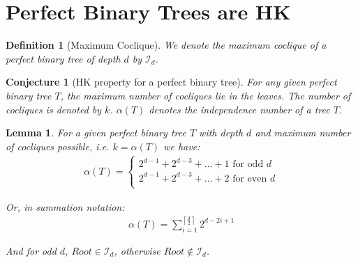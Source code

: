 \documentclass{amsart}
\newtheorem{lemma}[theorem]{Lemma}
\newtheorem{conjecture}[theorem]{Conjecture}
\newtheorem{definition}[theorem]{Definition}
\theoremstyle{definition}
\begin{document}
\section{Perfect Binary Trees are HK}

\begin{definition}[Maximum Coclique]
	We denote the maximum coclique of a perfect binary tree of depth $d$ by $\mathcal{I}_d$.
\end{definition}

\begin{conjecture}[HK property for a perfect binary tree]
	For any given perfect binary tree $T$, the maximum number of cocliques lie in the leaves. The number of cocliques is denoted by $k$. $\alpha(T)$ denotes the independence number of a tree $T$.
\end{conjecture}

\begin{lemma}\label{independence_num}
	For a given perfect binary tree $T$ with depth $d$ and maximum number of cocliques possible, i.e. $k = \alpha(T)$ we have:
	\begin{align*}
		\alpha(T) = \begin{cases}
			            2^{d - 1} + 2^{d-3} + \ldots + 1 \text{ for odd $d$}  \\
			            2^{d - 1} + 2^{d-3} + \ldots + 2 \text{ for even $d$} \\
		            \end{cases}
	\end{align*}

	Or, in summation notation:
	\begin{align*}
		\alpha(T) = \displaystyle\sum_{i = 1}^{\left\lceil \frac{d}{2} \right\rceil} 2^{d - 2i + 1}
	\end{align*}

	And for odd $d$, $Root \in \mathcal{I}_d$, otherwise $Root \not\in \mathcal{I}_d$.
\end{lemma}
\end{document}
